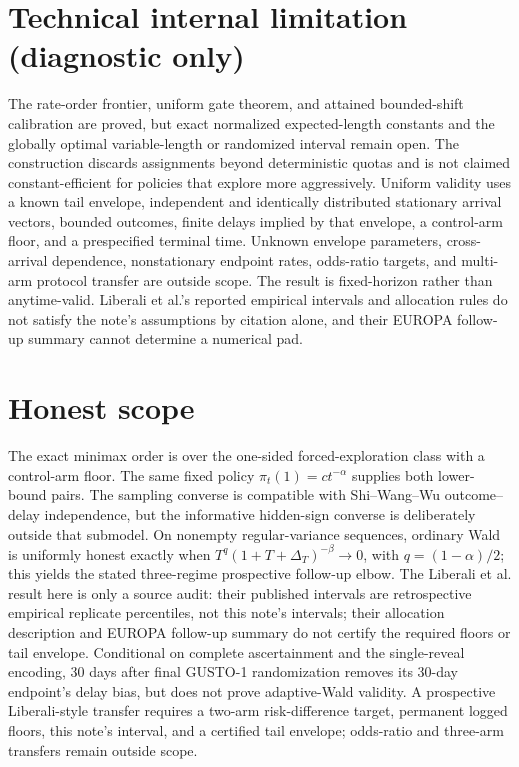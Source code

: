 \documentclass{article}
\begin{document}
\section*{Technical internal limitation (diagnostic only)}

The rate-order frontier, uniform gate theorem, and attained bounded-shift calibration are proved, but exact normalized expected-length constants and the globally optimal variable-length or randomized interval remain open. The construction discards assignments beyond deterministic quotas and is not claimed constant-efficient for policies that explore more aggressively. Uniform validity uses a known tail envelope, independent and identically distributed stationary arrival vectors, bounded outcomes, finite delays implied by that envelope, a control-arm floor, and a prespecified terminal time. Unknown envelope parameters, cross-arrival dependence, nonstationary endpoint rates, odds-ratio targets, and multi-arm protocol transfer are outside scope. The result is fixed-horizon rather than anytime-valid. Liberali et al.'s reported empirical intervals and allocation rules do not satisfy the note's assumptions by citation alone, and their EUROPA follow-up summary cannot determine a numerical pad.

\section{Honest scope}

The exact minimax order is over the one-sided forced-exploration class with a control-arm floor. The same fixed policy \(\pi_t(1)=ct^{-\alpha}\) supplies both lower-bound pairs. The sampling converse is compatible with Shi--Wang--Wu outcome--delay independence, but the informative hidden-sign converse is deliberately outside that submodel. On nonempty regular-variance sequences, ordinary Wald is uniformly honest exactly when \(T^q(1+T+\Delta_T)^{-\beta}\to0\), with \(q=(1-\alpha)/2\); this yields the stated three-regime prospective follow-up elbow. The Liberali et al. result here is only a source audit: their published intervals are retrospective empirical replicate percentiles, not this note's intervals; their allocation description and EUROPA follow-up summary do not certify the required floors or tail envelope. Conditional on complete ascertainment and the single-reveal encoding, 30 days after final GUSTO-1 randomization removes its 30-day endpoint's delay bias, but does not prove adaptive-Wald validity. A prospective Liberali-style transfer requires a two-arm risk-difference target, permanent logged floors, this note's interval, and a certified tail envelope; odds-ratio and three-arm transfers remain outside scope.
\end{document}
